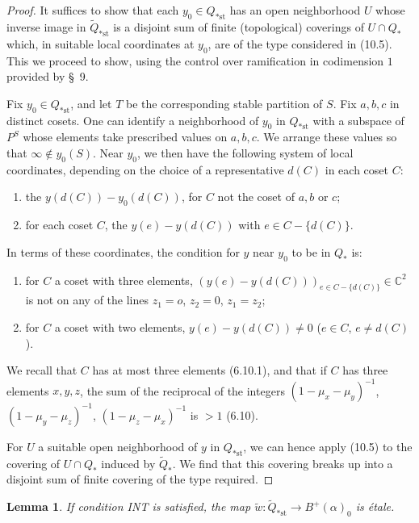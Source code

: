 \documentclass[12pt,a4paper]{article}
\theoremstyle{plain}
\newtheorem{lemma}[theorem]{Lemma}
\theoremstyle{definition}
\theoremstyle{remark}
\begin{document}
\begin{proof}
It suffices to show that each $y_0 \in Q_{*\text{st}}$ has an open neighborhood $U$ whose inverse image in $\widetilde{Q}_{*\text{st}}$ is a disjoint sum of finite (topological) coverings of $U \cap Q_*$ which, in suitable local coordinates at $y_0$, are of the type considered in (10.5). This we proceed to show, using the control over ramification in codimension $1$ provided by \S\ 9.

Fix $y_0 \in Q_{*\text{st}}$, and let $T$ be the corresponding stable partition of $S$. Fix $a, b, c$ in distinct cosets. One can identify a neighborhood of $y_0$ in $Q_{*\text{st}}$ with a subspace of $P^S$ whose elements take prescribed values on $a, b, c$. We arrange these values so that $\infty \notin y_0(S)$. Near $y_0$, we then have the following system of local coordinates, depending on the choice of a representative $d(C)$ in each coset $C$:
\begin{enumerate}
\item[a)] the $y(d(C)) - y_0(d(C))$, for $C$ not the coset of $a, b$ or $c$;
\item[b)] for each coset $C$, the $y(e) - y(d(C))$ with $e \in C - \{d(C)\}$.
\end{enumerate}

In terms of these coordinates, the condition for $y$ near $y_0$ to be in $Q_*$ is:
\begin{enumerate}
\item[a)] for $C$ a coset with three elements, $(y(e) - y(d(C)))_{e \in C - \{d(C)\}} \in \mathbb{C}^2$ is not on any of the lines $z_1 = o$, $z_2 = 0$, $z_1 = z_2$;
\item[b)] for $C$ a coset with two elements, $y(e) - y(d(C)) \neq 0$ ($e \in C$, $e \neq d(C)$).
\end{enumerate}
We recall that $C$ has at most three elements (6.10.1), and that if $C$ has three elements $x, y, z$, the sum of the reciprocal of the integers $(1 - \mu_x - \mu_y)^{-1}$, $(1 - \mu_y - \mu_z)^{-1}$, $(1 - \mu_z - \mu_x)^{-1}$ is $> 1$ (6.10).

For $U$ a suitable open neighborhood of $y$ in $Q_{*\text{st}}$, we can hence apply (10.5) to the covering of $U \cap Q_*$ induced by $\widetilde{Q}_*$. We find that this covering breaks up into a disjoint sum of finite covering of the type required.
\end{proof}

\begin{lemma}
\label{10.7}
If condition INT is satisfied, the map $\widetilde{w} : \widetilde{Q}_{*\text{st}} \to B^+(\alpha)_0$ is \'etale.
\end{lemma}
\end{document}
